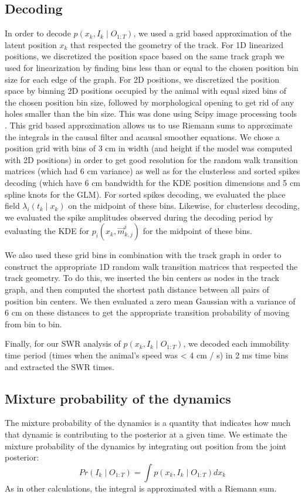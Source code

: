 \documentclass[times, twoside]{zHenriquesLab-StyleBioRxiv}
\begin{document}
\subsection*{Decoding}
In order to decode $p(x_{k}, I_{k} \mid O_{1:T})$, we used a grid based approximation of the latent position $x_k$ that respected the geometry of the track. For 1D linearized positions, we discretized the position space based on the same track graph we used for linearization by finding bins less than or equal to the chosen position bin size for each edge of the graph. For 2D positions, we discretized the position space by binning 2D positions occupied by the animal with equal sized bins of the chosen position bin size, followed by morphological opening to get rid of any holes smaller than the bin size. This was done using Scipy image processing tools \cite{SciPy1.0ContributorsSciPyfundamentalalgorithms2020}. This grid based approximation allows us to use Riemann sums to approximate the integrals in the causal filter and acausal smoother equations. We chose a position grid with bins of 3 cm in width (and height if the model was computed with 2D positions) in order to get good resolution for the random walk transition matrices (which had 6 cm variance) as well as for the clusterless and sorted spikes decoding (which have 6 cm bandwidth for the KDE position dimensions and 5 cm spline knots for the GLM). For sorted spikes decoding, we evaluated the place field $\lambda_{i}(t_{k} \mid x_{k})$ on the midpoint of these bins. Likewise, for clusterless decoding, we evaluated the spike amplitudes observed during the decoding period by evaluating the KDE for $p_{i}(x_k, \vec{m}^i_{k,j})$ for the midpoint of these bins.

We also used these grid bins in combination with the track graph in order to construct the appropriate 1D random walk transition matrices that respected the track geometry. To do this, we inserted the bin centers as nodes in the track graph, and then computed the shortest path distance between all pairs of position bin centers. We then evaluated a zero mean Gaussian with a variance of 6 cm on these distances to get the appropriate transition probability of moving from bin to bin.

Finally, for our SWR analysis of $p(x_{k}, I_{k} \mid O_{1:T})$, we decoded each immobility time period (times when the animal's speed was < 4 cm / s) in 2 ms time bins and extracted the SWR times.

\subsection*{Mixture probability of the dynamics}
The mixture probability of the dynamics is a quantity that indicates how much that dynamic is contributing to the posterior at a given time. We estimate the mixture probability of the dynamics by integrating out position from the joint posterior:
$$Pr(I_{k} \mid O_{1:T}) = \int p(x_{k}, I_{k} \mid O_{1:T}) dx_{k}$$
As in other calculations, the integral is approximated with a Riemann sum.
\end{document}

